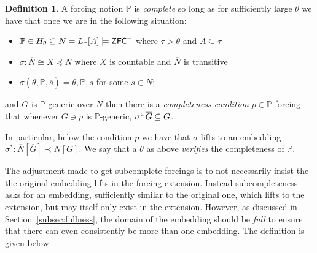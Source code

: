 \documentclass{amsart}
\theoremstyle{definition}
\newtheorem{definition}[theorem]{Definition}
\theoremstyle{remark}
\renewcommand{\P}{\mathbb{P}}
\newcommand{\N}{{\overline{N}}}
\newcommand{\G}{\overline{G}}
\newcommand{\ZFC}{\textup{\ensuremath{\textsf{ZFC}}}}
\begin{document}
\begin{definition} A forcing notion $\P$ is \emph{complete} so long as
for sufficiently large $\theta$ we have that once we are in the following situation: \begin{itemize}
	\item $\P \in H_\theta \subseteq N = L_\tau[A] \models \ZFC^-$ where $\tau>\theta$ and $A \subseteq \tau$
	\item $\sigma: \N \cong X \preccurlyeq N$ where $X$ is countable and $\N$ is transitive
	\item $\sigma(\overline \theta, \overline{\P}, \overline s)=\theta, \P, s$ for some $s \in N$;
\end{itemize}
and $\G$ is $\overline{\P}$-generic over $\N$ then there is a \emph{completeness condition} $p \in \P$ forcing that whenever $G \ni p$ is $\P$-generic, $\sigma ``\, \G \subseteq G$. 

In particular, below the condition $p$ we have that $\sigma$ lifts to an embedding $\sigma^*:\N[\G] \prec N[G]$.
We say that a $\theta$ as above \emph{verifies} the completeness of $\P$.
\end{definition}
The adjustment made to get subcomplete forcings is to not necessarily insist the the original embedding lifts in the forcing extension. Instead subcompleteness asks for an embedding, sufficiently similar
to the original one, which lifts to the extension, but may itself only exist in the extension.
However, as discussed in Section~\ref{subsec:fullness}, the domain of the embedding should be \emph{full} to ensure that there can even consistently be more than one embedding. The definition is given below.
\end{document}
